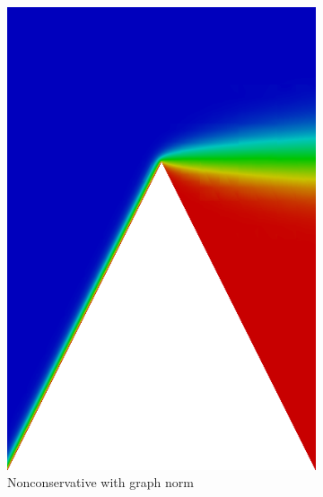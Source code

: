 \documentclass[letterpaper]{article}
\begin{document}
\begin{figure}
\centering
\begin{subfigure}[t]{0.4\textwidth}
\centering
\includegraphics[width=\textwidth]{figs/Wedge/graph16nc.png}
\caption{Nonconservative with graph norm}
\label{fig:wedgeGraph16nc}
\end{subfigure}
\begin{subfigure}[t]{0.4\textwidth}
\centering

\end{subfigure}
\end{figure}
\end{document}
